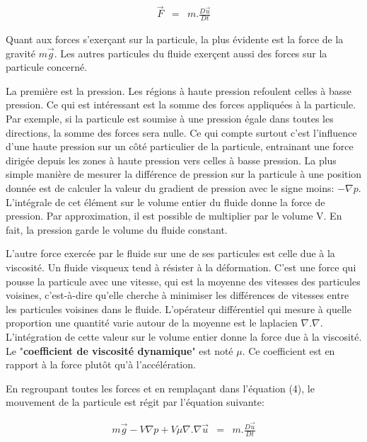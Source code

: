 \documentclass[11pt]{report}
\begin{document}
\begin{eqnarray}
\overrightarrow{F} & = & m. \frac{D \overrightarrow{u}}{Dt}
\end{eqnarray}

Quant aux forces s'exerçant sur la particule, la plus évidente est la force de la gravité $ m\overrightarrow{g} $. Les autres particules du fluide exerçent aussi des forces sur la particule concerné. \newline

La première est la pression. Les régions à haute pression refoulent celles à basse pression. Ce qui est intéressant est la somme des forces appliquées à la particule. Par exemple, si la particule est soumise à une pression égale dans toutes les directions, la somme des forces sera nulle. Ce qui compte surtout c'est l'influence d'une haute pression sur un côté particulier de la particule, entrainant une force dirigée depuis les zones à haute pression vers celles à basse pression. La plus simple manière de mesurer la différence de pression sur la particule à une position donnée est de calculer la valeur du gradient de pression avec le signe moins: $ - \nabla p $.
L'intégrale de cet élément sur le volume entier du fluide donne la force de pression. Par approximation, il est possible de multiplier par le volume V. En fait, la pression garde le volume du fluide constant.\newline

L'autre force exercée par le fluide sur une de ses particules est celle due à la viscosité. Un fluide visqueux tend à résister à la déformation. C'est une force qui pousse la particule avec une vitesse, qui est la moyenne des vitesses des particules voisines, c'est-à-dire qu'elle cherche à minimiser les différences de vitesses entre les particules voisines dans le fluide. L'opérateur différentiel qui mesure à quelle proportion une quantité varie autour de la moyenne est le laplacien $ \nabla . \nabla $. L'intégration de cette valeur sur le volume entier donne la force due à la viscosité. Le "\textbf{coefficient de viscosité dynamique}" est noté $ \mu $. Ce coefficient est en rapport à la force plutôt qu'à l'accélération.\newline

En regroupant toutes les forces et en remplaçant dans l'équation (4), le mouvement de la particule est régit par l'équation suivante:

\begin{eqnarray}
m\overrightarrow{g} - V \nabla p + V \mu \nabla . \nabla \overrightarrow{u} & = & m. \frac{D \overrightarrow{u}}{Dt}
\end{eqnarray}
\end{document}
